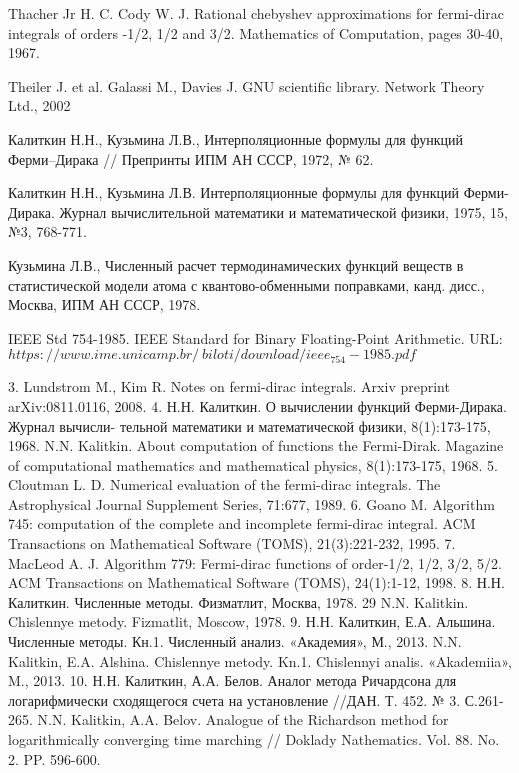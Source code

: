 \begin{thebibliography}{99}
 Thacher Jr H. C. Cody W. J. Rational chebyshev approximations for fermi-dirac integrals of orders -1/2, 1/2 and 3/2. Mathematics of Computation, pages 30-40, 1967.

 Theiler J. et al. Galassi M., Davies J. GNU scientific library. Network Theory Ltd., 2002

 Калиткин Н.Н., Кузьмина Л.В., Интерполяционные формулы для функций Ферми–Дирака // Препринты ИПМ АН СССР, 1972, № 62.

 Калиткин Н.Н., Кузьмина Л.В. Интерполяционные формулы для функций Ферми-Дирака. Журнал вычислительной математики и математической физики, 1975, 15, №3, 768-771.

 Кузьмина Л.В., Численный расчет термодинамических функций веществ в статистической модели атома с квантово-обменными поправками, канд. дисс., Москва, ИПМ АН СССР, 1978.

 IEEE Std 754-1985. IEEE Standard for Binary Floating-Point Arithmetic. \linebreak
URL: \href{https://www.ime.unicamp.br/~biloti/download/ieee_754-1985.pdf}{$https://www.ime.unicamp.br/~biloti/download/ieee_754-1985.pdf$}

\end{thebibliography}





3. Lundstrom M., Kim R. Notes on fermi-dirac integrals. Arxiv preprint
arXiv:0811.0116, 2008.
4. Н.Н. Калиткин. О вычислении функций Ферми-Дирака. Журнал вычисли-
тельной математики и математической физики, 8(1):173-175, 1968.
N.N. Kalitkin. About computation of functions the Fermi-Dirak. Magazine of
computational mathematics and mathematical physics, 8(1):173-175, 1968.
5. Cloutman L. D. Numerical evaluation of the fermi-dirac integrals. The Astrophysical
Journal Supplement Series, 71:677, 1989.
6. Goano M. Algorithm 745: computation of the complete and incomplete fermi-dirac
integral. ACM Transactions on Mathematical Software (TOMS),
21(3):221-232, 1995.
7. MacLeod A. J. Algorithm 779: Fermi-dirac functions of order-1/2, 1/2, 3/2, 5/2.
ACM Transactions on Mathematical Software (TOMS), 24(1):1-12, 1998.
8. Н.Н. Калиткин. Численные методы. Физматлит, Москва, 1978.
29
N.N. Kalitkin. Chislennye metody. Fizmatlit, Moscow, 1978.
9. Н.Н. Калиткин, Е.А. Альшина. Численные методы. Кн.1. Численный анализ. «Академия», М., 2013.
N.N. Kalitkin, E.A. Alshina. Chislennye metody. Kn.1. Chislennyi analis.
«Akademiia», M., 2013.
10. Н.Н. Калиткин, А.А. Белов. Аналог метода Ричардсона для логарифмически сходящегося счета на установление //ДАН. Т. 452. № 3. С.261-265.
N.N. Kalitkin, A.A. Belov. Analogue of the Richardson method for logarithmically
converging time marching // Doklady Nathematics. Vol. 88. No. 2. PP. 596-600.

